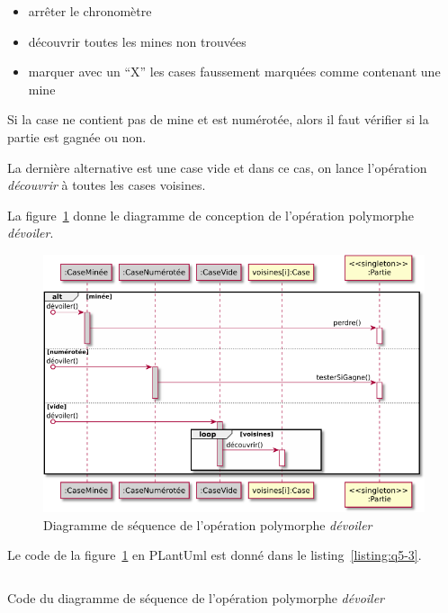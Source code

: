 \documentclass[a4paper,12pt]{article}
\begin{document}
\begin{itemize}
    \item arrêter le chronomètre
    \item découvrir toutes les mines non trouvées
    \item marquer avec un ``X'' les cases faussement marquées comme contenant une mine
\end{itemize}

Si la case ne contient pas de mine et est numérotée, alors il faut vérifier si la partie est gagnée ou non.

La dernière alternative est une case vide et dans ce cas, on lance l'opération \emph{découvrir} à toutes les cases voisines.

La figure~\ref{fig:q5-3} donne le diagramme de conception de l'opération polymorphe \emph{dévoiler}.

\begin{figure}[htpb]
    \centering
    \includegraphics[width=1\textwidth]{./images/q5-3.png}
    \caption{Diagramme de séquence de l'opération polymorphe \emph{dévoiler}}
    \label{fig:q5-3}
\end{figure}

Le code de la figure~\ref{fig:q5-3} en PLantUml est donné dans le listing~\ref{listing:q5-3}.

\begin{listing}[ht]
    \inputminted[bgcolor=lightgray!40,linenos=true]{fsharp}{./code-images/q5-3}
    \caption{Code du diagramme de séquence de l'opération polymorphe \emph{dévoiler}}
    \label{listing:q5-3}
\end{listing}

\clearpage
\end{document}
